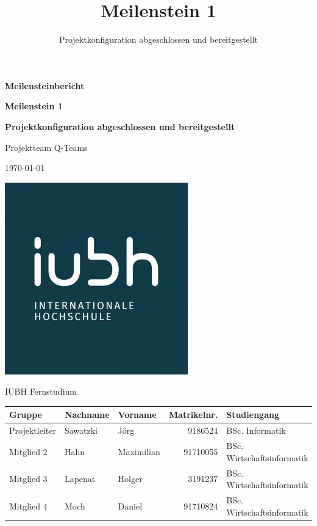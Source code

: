 \documentclass[a4paper,11pt,listof=numbered,glossary=totoc,parskip=half]{scrreprt}
\title{Meilenstein 1}
\subtitle{Projektkonfiguration abgeschlossen und bereitgestellt}
\begin{document}
	\begin{titlepage}
		
		\centering
		\vspace*{2.5cm}
		{\large\bfseries Meilensteinbericht\par}	
		{\Huge\bfseries Meilenstein 1\par}
		{\Large\bfseries Projektkonfiguration abgeschlossen und bereitgestellt\par}

		{\Large Projektteam \frqq{}Q-Teams\flqq{}\par}
		{\large\today\par}
		\vspace{0.5cm}

			
		
		\includegraphics[scale=0.5]{iubh_logo}
		
		IUBH Fernstudium
		\vspace{0.5cm}
		
		\begin{tabular}{lllrl}
			\toprule
			\textbf{Gruppe} & \textbf{Nachname} & \textbf{Vorname} & \textbf{Matrikelnr.} & \textbf{Studiengang} \\
			\midrule
			Projektleiter & Sawatzki & Jörg & 9186524 & BSc. Informatik \\
			Mitglied 2 & Hahn & Maximilian & 91710055 & BSc. Wirtschaftsinformatik \\
			Mitglied 3 & Lapenat & Holger & 3191237 & BSc. Wirtschaftsinformatik \\
			Mitglied 4 & Moch & Daniel & 91710824 & BSc. Wirtschaftsinformatik \\
			\bottomrule
		\end{tabular}	
	\end{titlepage}
	
\end{document}
